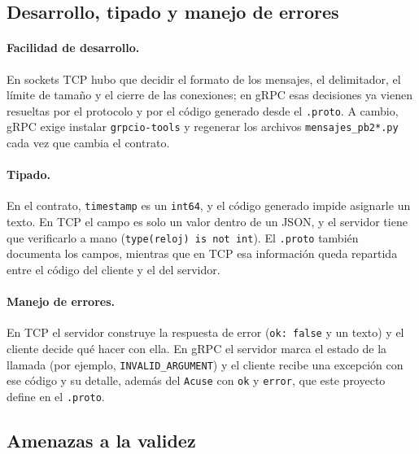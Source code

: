 \documentclass[11pt,a4paper]{article}
\begin{document}
\subsection{Desarrollo, tipado y manejo de errores}

\paragraph{Facilidad de desarrollo.} En sockets TCP hubo que decidir el formato de los
mensajes, el delimitador, el límite de tamaño y el cierre de las conexiones; en gRPC esas
decisiones ya vienen resueltas por el protocolo y por el código generado desde el
\texttt{.proto}. A cambio, gRPC exige instalar \texttt{grpcio-tools} y regenerar los
archivos \texttt{mensajes\_pb2*.py} cada vez que cambia el contrato.

\paragraph{Tipado.} En el contrato, \texttt{timestamp} es un \texttt{int64}, y el código
generado impide asignarle un texto. En TCP el campo es solo un valor dentro de un JSON, y
el servidor tiene que verificarlo a mano (\texttt{type(reloj) is not int}). El
\texttt{.proto} también documenta los campos, mientras que en TCP esa información queda
repartida entre el código del cliente y el del servidor.

\paragraph{Manejo de errores.} En TCP el servidor construye la respuesta de error
(\texttt{ok: false} y un texto) y el cliente decide qué hacer con ella. En gRPC el
servidor marca el estado de la llamada (por ejemplo, \texttt{INVALID\_ARGUMENT}) y el
cliente recibe una excepción con ese código y su detalle, además del \texttt{Acuse}
con \texttt{ok} y \texttt{error}, que este proyecto define en el \texttt{.proto}.

\subsection{Amenazas a la validez}\label{sec:mide}
\end{document}
